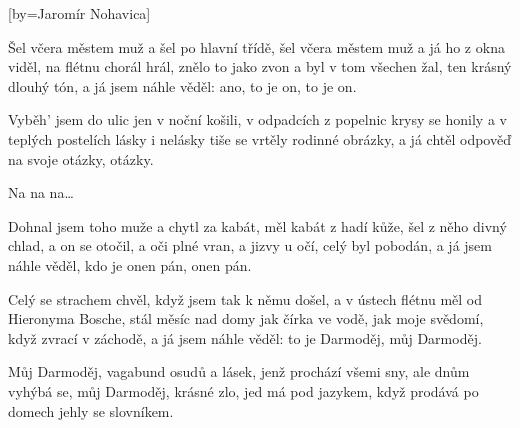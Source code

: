 [by={Jaromír Nohavica}]

\beginverse{}
Šel včera městem muž a šel po hlavní třídě,
šel včera městem muž a já ho z okna viděl,
na flétnu chorál hrál, znělo to jako zvon
a byl v tom všechen žal, ten krásný dlouhý tón,
a já jsem náhle věděl: ano, to je on, to je on.
\endverse{}

\beginverse{}
Vyběh' jsem do ulic jen v noční košili, 
v odpadcích z popelnic krysy se honily 
a v teplých postelích lásky i nelásky 
tiše se vrtěly rodinné obrázky, 
a já chtěl odpověď na svoje otázky, otázky.
\endverse{}

\beginchorus{}
Na na na\ldots{}     
       
\endchorus{}

\beginverse{}
Dohnal jsem toho muže a chytl za kabát, 
měl kabát z hadí kůže, šel z něho divný chlad,
a on se otočil, a oči plné vran, 
a jizvy u očí, celý byl pobodán, 
a já jsem náhle věděl, kdo je onen pán, onen pán.
\endverse{}

\beginverse{}
Celý se strachem chvěl, když jsem tak k němu došel,
a v ústech flétnu měl od Hieronyma Bosche,
stál měsíc nad domy jak čírka ve vodě,
jak moje svědomí, když zvrací v záchodě, 
a já jsem náhle věděl: to je Darmoděj, můj Darmoděj.
\endverse{}

\beginchorus{}
Můj Darmoděj, vagabund osudů a lásek,
jenž prochází všemi sny, ale dnům vyhýbá se,
můj Darmoděj, krásné zlo, jed má pod jazykem,
když prodává po domech jehly se slovníkem.
\endchorus{}

